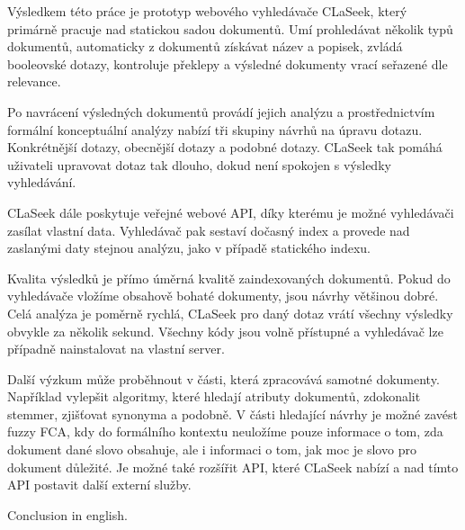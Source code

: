 \documentclass[12pt]{article}
\newcommand{\name}{CLaSeek}
\begin{document}
\begin{conclusions-cz}

Výsledkem této práce je prototyp webového vyhledávače \name{}, který primárně pracuje nad statickou sadou dokumentů. Umí prohledávat několik typů dokumentů, automaticky z dokumentů získávat název a popisek, zvládá booleovské dotazy, kontroluje překlepy a výsledné dokumenty vrací seřazené dle relevance. 

Po navrácení výsledných dokumentů provádí jejich analýzu a prostřednictvím formální konceptuální analýzy nabízí tři skupiny návrhů na úpravu dotazu. Konkrétnější dotazy, obecnější dotazy a podobné dotazy. \name{} tak pomáhá uživateli upravovat dotaz tak dlouho, dokud není spokojen s výsledky vyhledávání. 

\name{} dále poskytuje veřejné webové API, díky kterému je možné vyhledávači zasílat vlastní data. Vyhledávač pak sestaví dočasný index a provede nad zaslanými daty stejnou analýzu, jako v případě statického indexu. 

Kvalita výsledků je přímo úměrná kvalitě zaindexovaných dokumentů. Pokud do vyhledávače vložíme obsahově bohaté dokumenty, jsou návrhy většinou dobré. Celá analýza je poměrně rychlá, \name{} pro daný dotaz vrátí všechny výsledky obvykle za několik sekund. Všechny kódy jsou volně přístupné a vyhledávač lze případně nainstalovat na vlastní server. 

Další výzkum může proběhnout v části, která zpracovává samotné dokumenty. Například vylepšit algoritmy, které hledají atributy dokumentů, zdokonalit stemmer, zjišťovat synonyma a podobně. V části hledající návrhy je možné zavést fuzzy FCA, kdy do formálního kontextu neuložíme pouze informace o tom, zda dokument dané slovo obsahuje, ale i informaci o tom, jak moc je slovo pro dokument důležité. Je možné také rozšířit API, které \name{} nabízí a nad tímto API postavit další externí služby. 
\end{conclusions-cz}


\begin{conclusions-en}
  Conclusion in english.
\end{conclusions-en}

\newpage



\end{document}
